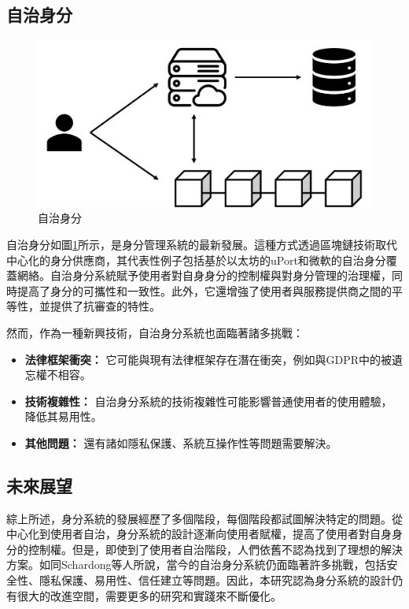 \subsection{自治身分}
\begin{figure}
  \centering
  \includegraphics[width=\linewidth,keepaspectratio]{figures/self-sovereign-identity.png}
  \caption{自治身分}
  \label{fig:self-sovereign-identity}
\end{figure}
自治身分如圖\ref{fig:self-sovereign-identity}所示，是身分管理系統的最新發展\cite{preukschat2021self}。這種方式透過區塊鏈技術取代中心化的身分供應商，其代表性例子包括基於以太坊的uPort和微軟的自治身分覆蓋網絡\cite{lundkvist2017uport, microsoft2020ion}。自治身分系統賦予使用者對自身身分的控制權與對身分管理的治理權，同時提高了身分的可攜性和一致性。此外，它還增強了使用者與服務提供商之間的平等性，並提供了抗審查的特性。

然而，作為一種新興技術，自治身分系統也面臨著諸多挑戰\cite{s22155641}：
\begin{itemize}
  \item \textbf{法律框架衝突：} 它可能與現有法律框架存在潛在衝突，例如與GDPR中的被遺忘權不相容\cite{finck2018blockchains}。
  \item \textbf{技術複雜性：} 自治身分系統的技術複雜性可能影響普通使用者的使用體驗，降低其易用性\cite{kubach2020self}。
  \item \textbf{其他問題：} 還有諸如隱私保護、系統互操作性等問題需要解決。
\end{itemize}
\subsection{未來展望}
綜上所述，身分系統的發展經歷了多個階段，每個階段都試圖解決特定的問題。從中心化到使用者自治，身分系統的設計逐漸向使用者賦權，提高了使用者對自身身分的控制權。但是，即使到了使用者自治階段，人們依舊不認為找到了理想的解決方案。如同Schardong等人\cite{s22155641,soltani2021surveydid}所說，當今的自治身分系統仍面臨著許多挑戰，包括安全性、隱私保護、易用性、信任建立等問題。因此，本研究認為身分系統的設計仍有很大的改進空間，需要更多的研究和實踐來不斷優化。
